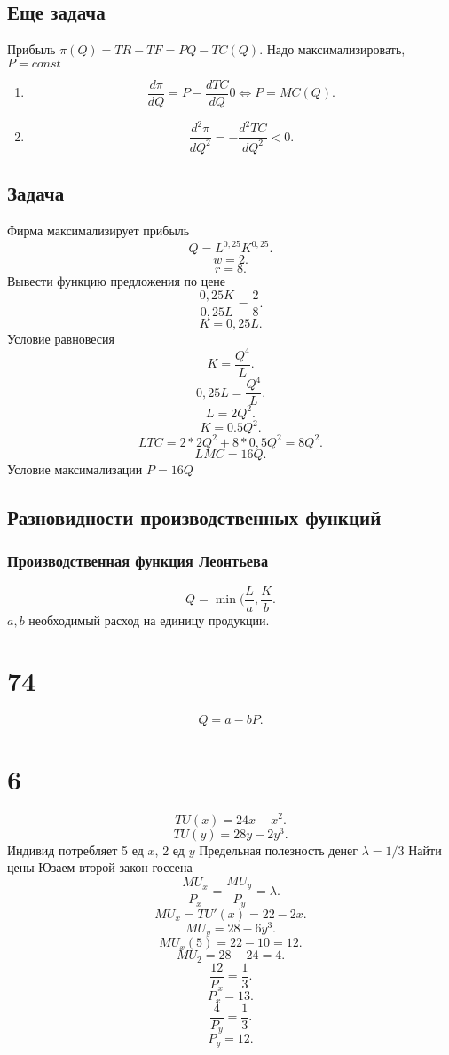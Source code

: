 \documentclass[14pt]{extarticle}
\begin{document}
\subsection{Еще задача}
Прибыль $\pi(Q) = TR - TF = PQ  - TC(Q)$. Надо максимализировать, $P = const$
\begin{enumerate}
    \item 
        \[
        \frac{d \pi}{d Q} = P - \frac{d TC}{d Q} 0 \iff P = M C(Q)
        .\] 
    \item 
        \[
        \frac{d^2 \pi}{d Q^2} = - \frac{d^2 TC}{d Q^2} < 0
        .\] 
\end{enumerate}
\subsection{Задача}
Фирма максимализирует прибыль
\[
Q = L^{0,25}K^{0,25}
.\] 
\[
w = 2
.\] 
\[
r = 8
.\] 
Вывести функцию предложения по цене
\[
\frac{0,25 K}{0,25 L} = \frac{2}{8}
.\] 
\[
K =0,25 L
.\] 
Условие равновесия
\[
    K = \frac{Q^{4}}{L}
.\] 
\[
0,25 L =\frac{Q^{4}}{L}
.\] 
\[
L = 2 Q ^2
.\] 
\[
K =0.5 Q^2
.\] 
\[
    LTC = 2 * 2Q^2 + 8 * 0,5 Q^2 = 8 Q ^2
.\] 
\[
LMC = 16 Q
.\] 
Условие максимализации $P = 16 Q$
\subsection{Разновидности производственных функций}
\subsubsection{Производственная функция Леонтьева}
 \[
     Q = \min{(\frac{L}{a},\frac{K}{b}}
.\] 
$a,b$ необходимый расход на единицу продукции.
\section{74}
\[
Q = a - bP
.\] 
\section*{6}
\[
TU(x) = 24x - x^2
.\] 
\[
TU(y) = 28y - 2y^{3}
.\] 
Индивид потребляет 5 ед  $x$, 2 ед  $y$
Предельная полезность денег $\lambda = 1/3$
Найти цены
Юзаем второй закон госсена
\[
\frac{MU_{x}}{P_{x}} = \frac{MU_{y}}{P_{y}} = \lambda
.\] 
\[
MU_{x} = TU'(x) = 22 -2x
.\] 
\[
MU_{y} = 28 - 6y^{3}
.\] 
\[
MU_{x}(5) = 22 - 10 = 12
.\] 
\[
MU_{2} = 28 - 24 = 4
.\] 
\[
\frac{12}{P_{x}} = \frac{1}{3}
.\] 
\[
P_{x}=  13
.\] 
\[
\frac{4}{P_{y}} = \frac{1}{3}
.\] 
\[
P_{y} = 12
.\] 
\end{document}
